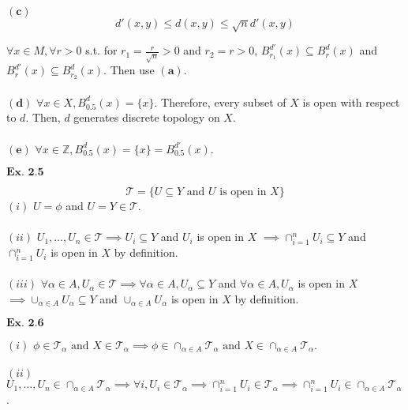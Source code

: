 \documentclass{article}
\begin{document}
$\mathbf{(c)}$ $$d'(x,y) \leq d(x,y) \leq \sqrt{n}d'(x,y)$$

$\forall x \in M, \forall r>0$ s.t. for $r_1 = \frac{r}{\sqrt{n}} > 0$ and $r_2 = r > 0$, $B_{r_1}^{d'}(x) \subseteq B_{r}^{d}(x)$ and $B_{r}^{d'}(x) \subseteq B_{r_2}^{d}(x)$. Then use ${\mathbf{(a)}}$.\\~\\

$\mathbf{(d)}$ $\forall x \in X, B_{0.5}^{d}(x) = \{x\}$. Therefore, every subset of $X$ is open with respect to $d$. Then, $d$ generates discrete topology on $X$.\\~\\

$\mathbf{(e)}$ $\forall x \in \mathbb{Z}, B_{0.5}^{d}(x) = \{x\} = B_{0.5}^{d'}(x)$.

\vspace{0.2in}

${\textbf{Ex. 2.5}}$

$$\mathcal{T} = \{U \subseteq Y \text{ and } U \text{ is open in }X\}$$
$(i)$ $U=\phi$ and  $U=Y \in \mathcal{T}$.\\~\\

$(ii)$ $U_1,\ldots,U_n\in\mathcal{T} \implies U_i \subseteq Y$ and $U_i$ is open in $X$ $\implies \cap_{i=1}^{n}U_i \subseteq Y$ and $\cap_{i=1}^{n}U_i$ is open in $X$ by definition.\\~\\

$(iii)$ $\forall \alpha \in A, U_\alpha\in\mathcal{T} \implies \forall \alpha \in A, U_\alpha\subseteq Y$ and $\forall \alpha \in A, U_\alpha$ is open in $X$ $\implies \cup_{\alpha\in A}U_\alpha \subseteq Y$ and $\cup_{\alpha\in A}U_\alpha$ is open in $X$ by definition.

\vspace{0.2in}

${\textbf{Ex. 2.6}}$

$(i)$ $\phi \in \mathcal{T}_{\alpha} \text{ and } X \in \mathcal{T}_{\alpha} \implies \phi \in \cap_{\alpha\in A}\mathcal{T}_{\alpha} \text{ and } X \in \cap_{\alpha\in A}\mathcal{T}_{\alpha}$.\\~\\

$(ii)$ $U_1,\ldots,U_n\in\cap_{\alpha\in A}\mathcal{T}_{\alpha} \implies \forall i, U_i \in \mathcal{T}_{\alpha} \implies \cap_{i=1}^{n}U_i \in \mathcal{T}_{\alpha}\implies \cap_{i=1}^{n}U_i\in\cap_{\alpha\in A}\mathcal{T}_{\alpha}$.\\~\\
\end{document}
